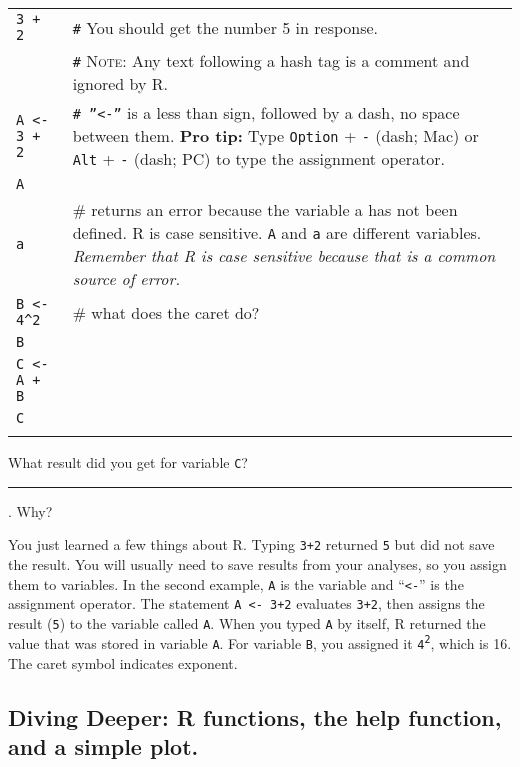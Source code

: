\documentclass[11pt]{article}
\begin{document}
\begin{tabular}{@{}L{1in}L{4.5in}@{}}
\texttt{3 + 2} & \texttt{\#} You should get the number 5 in response.\\
%
	& 	\texttt{\#} \textsc{Note:} Any text following a hash tag is a comment and ignored
by R.\\
%
\texttt{A \textless{}- 3 + 2} & \texttt{\# ''\textless{}-''} is a less than sign, followed
by a dash, no space between them. \textbf{Pro tip:} Type \texttt{Option} + \texttt{-} (dash; Mac) or \texttt{Alt} + \texttt{-} (dash; PC) to type the assignment operator.\\
 
\texttt{A} & \\

\texttt{a} & \# returns an error because the variable a has not been defined. R is
case sensitive.  \texttt{A} and \texttt{a} are different variables. \textit{Remember that R is case sensitive because
that is a common source of error.}\\[2ex]

	
\texttt{B \textless{}- 4\^{}2}	&	 \# what does the caret do?\\ 
\texttt{B}	& \\[2ex]
	
\texttt{C \textless{}- A + B} & \\
\texttt{C}	& \\
	&	\\
\end{tabular}


What result did you get for variable \texttt{C}? \rule{5cm}{0.4pt}. Why?

You just learned a few things about R. Typing \texttt{3+2} returned \texttt{5} but did not
save the result. You will usually need to save results from your
analyses, so you assign them to variables. In the second example, \texttt{A} is
the variable and ``\texttt{\textless{}-}'' is the assignment operator. The
statement \texttt{A \textless{}- 3+2} evaluates \texttt{3+2}, then assigns the result (\texttt{5})
to the variable called \texttt{A}. When you typed \texttt{A} by itself, R returned the
value that was stored in variable \texttt{A}. For variable \texttt{B}, you assigned it
\texttt{4\textsuperscript{2}}, which is 16. The caret symbol indicates exponent.

\subsection*{Diving Deeper: R functions, the help function, and a simple
plot.}
\end{document}
